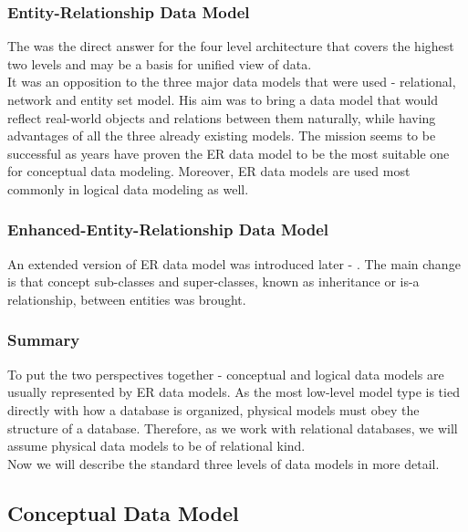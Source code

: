 \subsubsection{Entity-Relationship Data Model}

The  was the direct answer for the four level architecture\cite{Chen76theentity-relationship} that covers the highest two levels and may be a basis for unified view of data. \\
It was an opposition to the three major data models that were used - relational, network and entity set model. His aim was to bring a data model that would reflect real-world objects and relations between them naturally, while having advantages of all the three already existing models. The mission seems to be successful as years have proven the ER data model to be the most suitable one for conceptual data modeling. Moreover, ER data models are used most commonly in logical data modeling as well.

\subsubsection{Enhanced-Entity-Relationship Data Model}

An extended version of ER data model was introduced later - . The main change is that concept sub-classes and super-classes, known as inheritance or is-a relationship, between entities was brought. \\ 

\subsubsection{Summary}

To put the two perspectives together - conceptual and logical data models are usually represented by ER data models.
As the most low-level model type is tied directly with how a database is organized, physical models must obey the structure of a database. 
Therefore, as we work with relational databases, we will assume physical data models to be of relational kind. \\

Now we will describe the standard three levels of data models in more detail.

\subsection{Conceptual Data Model}

